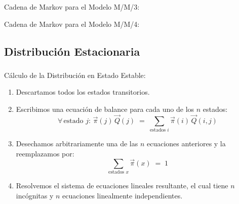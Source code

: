 \documentclass[ 10pt, xcolor = dvipsnames]{beamer}
\begin{document}
\begin{frame}[allowframebreaks]
\framebreak

Cadena de Markov para el Modelo M/M/3: 
\begin{figure}[htb]
\centering
\def\svgwidth{0.75\columnwidth}

\end{figure}

Cadena de Markov para el Modelo M/M/4: 
\begin{figure}[htb]
\centering
\def\svgwidth{0.75\columnwidth}

\end{figure}

\end{frame}

\subsection{Distribuci\'on Estacionaria}

\begin{frame}[allowframebreaks]
\frametitle{\insertsubsection}

C\'alculo de la Distribuci\'on en Estado Estable: 
\begin{enumerate}
\item Descartamos todos los estados transitorios. 
\item Escribimos una ecuaci\'on de balance para cada uno de los $n$ estados: 
\[
\forall \, \text{estado } j \colon \, \vec{\pi}(j) \, \vec{Q}(j) \; = \; 
\sum_{\text{estados }i} \vec{\pi}(i) \, \vec{Q}(i,j) 
\]
\item Desechamos arbitrariamente una de las $n$ ecuaciones anteriores y la reemplazamos por: 
\[
\sum_{\text{estados }x} \vec{\pi}(x) \; = \; 1
\]
\item Resolvemos el sistema de ecuaciones lineales resultante, el cual tiene \linebreak $n$ inc\'ognitas y $n$ ecuaciones linealmente independientes. 

\end{enumerate}

\end{frame}
\end{document}

